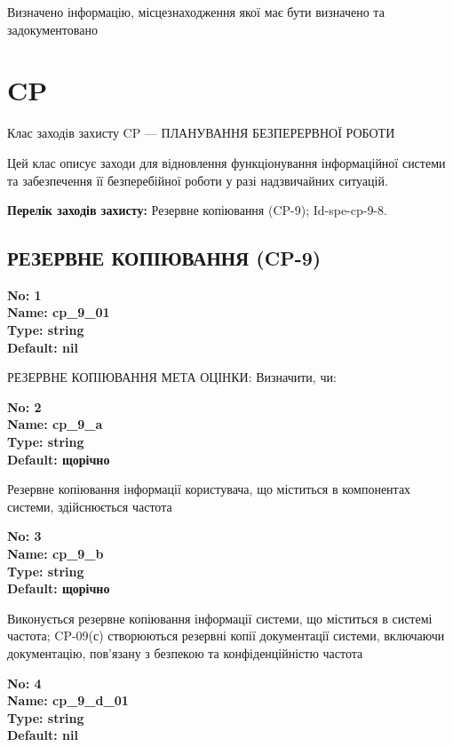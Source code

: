 \documentclass{article}
\begin{document}
{\footnotesize Визначено інформацію, місцезнаходження якої має бути визначено та задокументовано}




\section{CP}
Клас заходів захисту CP --- ПЛАНУВАННЯ БЕЗПЕРЕРВНОЇ РОБОТИ

Цей клас описує заходи для відновлення функціонування інформаційної системи та забезпечення її безперебійної роботи у разі надзвичайних ситуацій.

\textbf{Перелік заходів захисту:} Резервне копіювання (CP-9); Id-spe-cp-9-8.

\subsection{РЕЗЕРВНЕ КОПІЮВАННЯ (CP-9)}


\vspace{10pt}
{\footnotesize\bfseries
No: 1\\
Name: cp\_\allowbreak{}9\_\allowbreak{}01\\
Type: string\\
Default: nil
}

{\footnotesize РЕЗЕРВНЕ КОПІЮВАННЯ МЕТА ОЦІНКИ: Визначити, чи:}


{\footnotesize\bfseries
No: 2\\
Name: cp\_\allowbreak{}9\_\allowbreak{}a\\
Type: string\\
Default: \textquotedbl{}щорічно\textquotedbl{}
}

{\footnotesize Резервне копіювання інформації користувача, що міститься в компонентах системи, здійснюється частота}


{\footnotesize\bfseries
No: 3\\
Name: cp\_\allowbreak{}9\_\allowbreak{}b\\
Type: string\\
Default: \textquotedbl{}щорічно\textquotedbl{}
}

{\footnotesize Виконується резервне копіювання інформації системи, що міститься в системі частота; CP-09(с) створюються резервні копії документації системи, включаючи документацію, пов'язану з безпекою та конфіденційністю частота}


{\footnotesize\bfseries
No: 4\\
Name: cp\_\allowbreak{}9\_\allowbreak{}d\_\allowbreak{}01\\
Type: string\\
Default: nil
}
\end{document}
